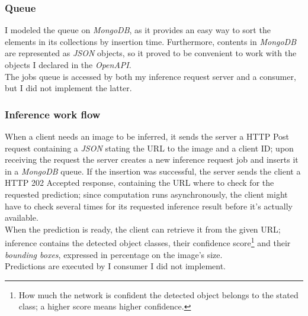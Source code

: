 \subsubsection{Queue}
I modeled the queue on \emph{MongoDB}, as it provides an easy way to sort the elements in its collections by insertion time. Furthermore, contents in \emph{MongoDB} are represented as \emph{JSON} objects, so it proved to be convenient to work with the objects I declared in the \emph{OpenAPI}. \\
The jobs queue is accessed by both my inference request server and a consumer, but I did not implement the latter.

\subsubsection{Inference work flow}
When a client needs an image to be inferred, it sends the server a HTTP Post request containing a \emph{JSON} stating the URL to the image and a client ID; upon receiving the request the server creates a new inference request job and inserts it in a \emph{MongoDB} queue. If the insertion was successful, the server sends the client a HTTP 202 Accepted response, containing the URL where to check for the requested prediction; since computation runs asynchronously, the client might have to check several times for its requested inference result before it's actually available. \\
When the prediction is ready, the client can retrieve it from the given URL; inference contains the detected object classes, their confidence score\footnote{How much the network is confident the detected object belongs to the stated class; a higher score means higher confidence.} and their \emph{bounding boxes}, expressed in percentage on the image's size. \\
Predictions are executed by I consumer I did not implement.

